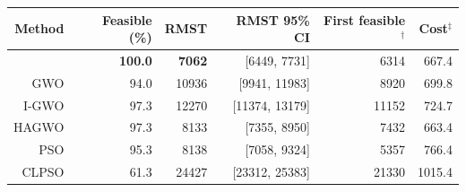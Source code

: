 \begin{tabular}{rrrrrr}
\toprule
Method & Feasible (\%) & RMST & RMST 95\% CI & First feasible$^{\dagger}$ & Cost$^{\ddagger}$ \\
\midrule
\method{} & \textbf{100.0} & \textbf{7062} & [6449, 7731] & 6314 & 667.4 \\
GWO & 94.0 & 10936 & [9941, 11983] & 8920 & 699.8 \\
I-GWO & 97.3 & 12270 & [11374, 13179] & 11152 & 724.7 \\
HAGWO & 97.3 & 8133 & [7355, 8950] & 7432 & 663.4 \\
PSO & 95.3 & 8138 & [7058, 9324] & 5357 & 766.4 \\
CLPSO & 61.3 & 24427 & [23312, 25383] & 21330 & 1015.4 \\
\bottomrule
\end{tabular}
